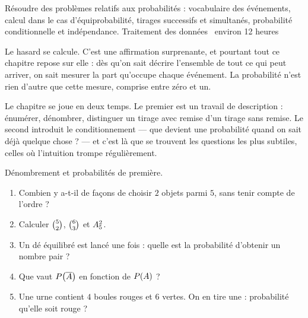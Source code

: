   {Résoudre des problèmes relatifs aux probabilités : vocabulaire des
   événements, calcul dans le cas d'équiprobabilité, tirages successifs et
   simultanés, probabilité conditionnelle et indépendance.}
  {Traitement des données \textbullet\ environ 12 heures}

Le hasard se calcule. C'est une affirmation surprenante, et pourtant tout ce
chapitre repose sur elle : dès qu'on sait décrire l'ensemble de tout ce qui
peut arriver, on sait mesurer la part qu'occupe chaque événement. La
probabilité n'est rien d'autre que cette mesure, comprise entre zéro et un.

Le chapitre se joue en deux temps. Le premier est un travail de description :
énumérer, dénombrer, distinguer un tirage avec remise d'un tirage sans remise.
Le second introduit le conditionnement — que devient une probabilité quand on
sait déjà quelque chose ? — et c'est là que se trouvent les questions les plus
subtiles, celles où l'intuition trompe régulièrement.

\begin{revision}
Dénombrement et probabilités de première.

\begin{enumerate}[label=\textbf{\arabic*.}, leftmargin=*, itemsep=0.35em]
  \item Combien y a-t-il de façons de choisir $2$ objets parmi $5$, sans tenir
        compte de l'ordre ?
  \item Calculer $\combi{2}{5}$, $\combi{3}{6}$ et $\arrang{2}{5}$.
  \item Un dé équilibré est lancé une fois : quelle est la probabilité
        d'obtenir un nombre pair ?
  \item Que vaut $\proba{\evtc{A}}$ en fonction de $\proba{A}$ ?
  \item Une urne contient $4$ boules rouges et $6$ vertes. On en tire une :
        probabilité qu'elle soit rouge ?
\end{enumerate}
\end{revision}

